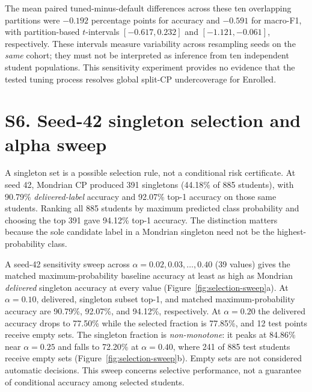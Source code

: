 The mean paired tuned-minus-default differences across these ten overlapping
partitions were $-0.192$ percentage points for accuracy and $-0.591$ for
macro-F1, with partition-based $t$-intervals $[-0.617,0.232]$ and
$[-1.121,-0.061]$, respectively. These intervals measure variability
across resampling seeds on the \emph{same} cohort; they must not be
interpreted as inference from ten independent student populations. This
sensitivity experiment provides no evidence that the tested tuning process
resolves global split-CP undercoverage for \textsf{Enrolled}.


\section*{S6. Seed-42 singleton selection and alpha sweep}
A singleton set is a possible selection rule, not a conditional risk
certificate. At seed 42, Mondrian CP produced 391 singletons (44.18\% of
885 students), with 90.79\% \emph{delivered-label} accuracy and 92.07\%
top-1 accuracy on those same students. Ranking all 885 students by maximum
predicted class probability and choosing the top 391 gave 94.12\% top-1
accuracy. The distinction matters because the sole candidate label in a
Mondrian singleton need not be the highest-probability class.


A seed-42 sensitivity sweep across $\alpha=0.02,0.03,\ldots,0.40$
(39 values) gives the matched maximum-probability baseline accuracy at least
as high as Mondrian \emph{delivered} singleton accuracy at every value
(Figure~\ref{fig:selection-sweep}a). At $\alpha=0.10$, delivered, singleton
subset top-1, and matched maximum-probability accuracy are 90.79\%,
92.07\%, and 94.12\%, respectively. At $\alpha=0.20$ the delivered
accuracy drops to 77.50\% while the selected fraction is 77.85\%, and
12 test points receive empty sets. The singleton fraction is
\emph{non-monotone}: it peaks at 84.86\% near $\alpha=0.25$ and falls
to 72.20\% at $\alpha=0.40$, where 241 of 885 test students receive
empty sets (Figure~\ref{fig:selection-sweep}b). Empty sets are not
considered automatic decisions. This sweep concerns selective performance,
not a guarantee of conditional accuracy among selected students.

